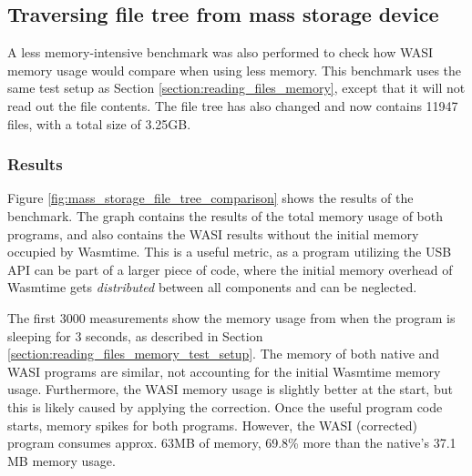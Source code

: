 \subsection{Traversing file tree from mass storage device}
\label{section:travering_file_tree_memory}
A less memory-intensive benchmark was also performed to check how \acrshort{WASI} memory usage would compare when using less memory. This benchmark uses the same test setup as Section \ref{section:reading_files_memory}, except that it will not read out the file contents. The file tree has also changed and now contains 11947 files, with a total size of 3.25GB.

\subsubsection{Results}

Figure \ref{fig:mass_storage_file_tree_comparison} shows the results of the benchmark. The graph contains the results of the total memory usage of both programs, and also contains the \acrshort{WASI} results without the initial memory occupied by Wasmtime. This is a useful metric, as a program utilizing the \acrshort{USB} \acrshort{API} can be part of a larger piece of code, where the initial memory overhead of Wasmtime gets \textit{distributed} between all components and can be neglected.

The first 3000 measurements show the memory usage from when the program is sleeping for 3 seconds, as described in Section \ref{section:reading_files_memory_test_setup}. The memory of both native and \acrshort{WASI} programs are similar, not accounting for the initial Wasmtime memory usage. Furthermore, the \acrshort{WASI} memory usage is slightly better at the start, but this is likely caused by applying the correction. Once the useful program code starts, memory spikes for both programs. However, the \acrshort{WASI} (corrected) program consumes approx. 63MB of memory, 69.8\% more than the native's 37.1 MB memory usage.

